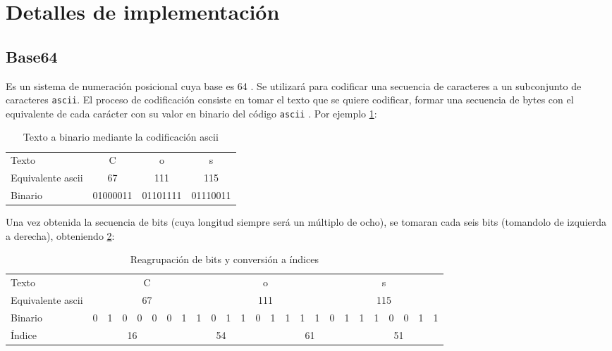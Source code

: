 \documentclass[titlepage,a4paper]{article}
\begin{document}

\section{Detalles de implementación}\label{sec:detalles_implementacion}

\subsection{Base64}
Es un sistema de numeración posicional cuya base es 64 \cite{base64}. Se utilizará para codificar una secuencia de caracteres a un subconjunto de caracteres \verb|ascii|. El proceso de codificación consiste en tomar el texto que se quiere codificar, formar una secuencia de bytes con el equivalente de cada carácter con su valor en binario del código \verb|ascii| \cite{ascii_table}. Por ejemplo \ref{table:paso_1}:

\begin{table}[H]
\centering
\begin{tabular}{l|ccc}
Texto             & C        & o        & s        \\
Equivalente ascii & 67       & 111      & 115      \\
Binario           & 01000011 & 01101111 & 01110011
\end{tabular}
\caption{Texto a binario mediante la codificación ascii}
\label{table:paso_1}
\centering
\end{table}

Una vez obtenida la secuencia de bits (cuya longitud siempre será un múltiplo de ocho), se tomaran cada seis bits (tomandolo de izquierda a derecha), obteniendo \ref{table:paso_2}:

\begin{table}[H]
\centering
\setlength{\tabcolsep}{4pt}
\begin{tabular}{l|cccccc||cc|cccc||cccc|cc||cccccc}
Texto             & \multicolumn{8}{c|}{C}        & \multicolumn{8}{c|}{o}        & \multicolumn{8}{c}{s}        \\
Equivalente ascii & \multicolumn{8}{c|}{67}       & \multicolumn{8}{c|}{111}      & \multicolumn{8}{c}{115}      \\
Binario           &0& 1 & 0 & 0 & 0 & 0 & 1 & 1 & 0 & 1 & 1 & 0 & 1 & 1 & 1 & 1 & 0 & 1 & 1 & 1 & 0 & 0 & 1 & 1 \\
Índice & \multicolumn{6}{c||}{16} & \multicolumn{6}{c||}{54} & \multicolumn{6}{c||}{61} & \multicolumn{6}{c}{51}

\end{tabular}
\caption{Reagrupación de bits y conversión a índices}
\label{table:paso_2}
\centering
\end{table}
\end{document}
